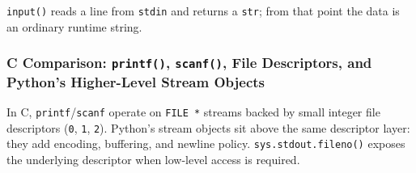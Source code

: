 \texttt{input()} reads a line from \texttt{stdin} and returns a \texttt{str}; from that point the data is an ordinary runtime string.

\subsubsection{C Comparison: \texttt{printf()}, \texttt{scanf()}, File Descriptors, and Python's Higher-Level Stream Objects}

In C, \texttt{printf}/\texttt{scanf} operate on \texttt{FILE *} streams backed by small integer file descriptors (\texttt{0}, \texttt{1}, \texttt{2}). Python's stream objects sit above the same descriptor layer: they add encoding, buffering, and newline policy. \texttt{sys.stdout.fileno()} exposes the underlying descriptor when low-level access is required.


